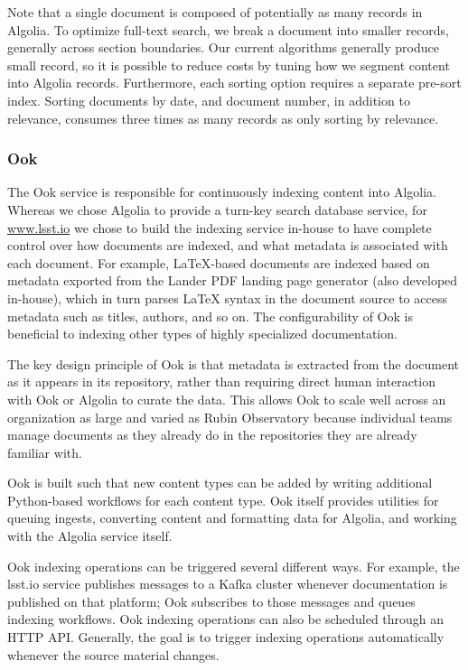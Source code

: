 Note that a single document is composed of potentially as many records in Algolia.
To optimize full-text search, we break a document into smaller records, generally across section boundaries.
Our current algorithms generally produce small record, so it is possible to reduce costs by tuning how we segment content into Algolia records.
Furthermore, each sorting option requires a separate pre-sort index.
Sorting documents by date, and document number, in addition to relevance, consumes three times as many records as only sorting by relevance.

\subsubsection{Ook}

The Ook service is responsible for continuously indexing content into Algolia. \citep{ook-cite}
Whereas we chose Algolia to provide a turn-key search database service, for \url{www.lsst.io} we chose to build the indexing service in-house to have complete control over how documents are indexed, and what metadata is associated with each document.
For example, LaTeX-based documents are indexed based on metadata exported from the Lander PDF landing page generator (also developed in-house), which in turn parses LaTeX syntax in the document source to access metadata such as titles, authors, and so on.
The configurability of Ook is beneficial to indexing other types of highly specialized documentation.

The key design principle of Ook is that metadata is extracted from the document as it appears in its repository, rather than requiring direct human interaction with Ook or Algolia to curate the data.
This allows Ook to scale well across an organization as large and varied as Rubin Observatory because individual teams manage documents as they already do in the repositories they are already familiar with.

Ook is built such that new content types can be added by writing additional Python-based workflows for each content type.
Ook itself provides utilities for queuing ingests, converting content and formatting data for Algolia, and working with the Algolia service itself.

Ook indexing operations can be triggered several different ways.
For example, the lsst.io service publishes messages to a Kafka cluster whenever documentation is published on that platform; Ook subscribes to those messages and queues indexing workflows.
Ook indexing operations can also be scheduled through an HTTP API.
Generally, the goal is to trigger indexing operations automatically whenever the source material changes.


